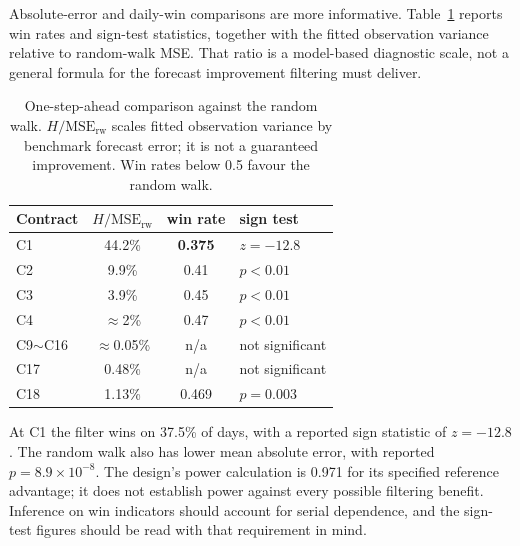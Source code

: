 \documentclass[journal]{IEEEtran}
\newcommand{\rng}{\ensuremath{\sim}}
\begin{document}
Absolute-error and daily-win comparisons are more informative. Table~\ref{tab:denoisetest} reports win rates and sign-test statistics, together with the fitted observation variance relative to random-walk MSE. That ratio is a model-based diagnostic scale, not a general formula for the forecast improvement filtering must deliver.
\begin{table}[H]
\centering
\caption{One-step-ahead comparison against the random walk. $H/\mathrm{MSE}_{\mathrm{rw}}$ scales fitted observation variance by benchmark forecast error; it is not a guaranteed improvement. Win rates below 0.5 favour the random walk.}
\label{tab:denoisetest}
\small
\setlength{\tabcolsep}{5pt}
\renewcommand{\arraystretch}{1.2}
\begin{tabular}{@{}lccl@{}}
\toprule
\textbf{Contract} & \textbf{$H/\mathrm{MSE}_{\mathrm{rw}}$} & \textbf{win rate} & \textbf{sign test} \\
\midrule
C1        & 44.2\%  & \textbf{0.375} & $z = -12.8$ \\
C2        & 9.9\%   & 0.41  & $p < 0.01$ \\
C3        & 3.9\%   & 0.45  & $p < 0.01$ \\
C4        & $\approx$2\% & 0.47 & $p < 0.01$ \\
C9\rng{}C16   & $\approx$0.05\% & n/a & not significant \\
C17       & 0.48\%  & n/a   & not significant \\
C18       & 1.13\%  & 0.469 & $p = 0.003$ \\
\bottomrule
\end{tabular}
\end{table}

At C1 the filter wins on 37.5\% of days, with a reported sign statistic of $z=-12.8$. The random walk also has lower mean absolute error, with reported $p=8.9\times10^{-8}$. The design's power calculation is 0.971 for its specified reference advantage; it does not establish power against every possible filtering benefit. Inference on win indicators should account for serial dependence, and the sign-test figures should be read with that requirement in mind.
\end{document}
